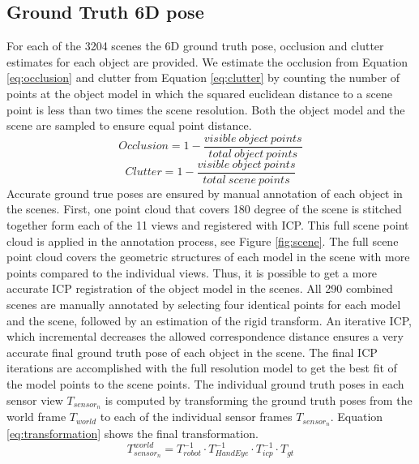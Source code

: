 \documentclass[10pt,twocolumn,letterpaper]{article}
\begin{document}
\subsection{Ground Truth 6D pose}\label{sec:gt_pose}
For each of the 3204 scenes the 6D ground truth pose, occlusion and clutter estimates for each object are provided. We estimate the occlusion from Equation \ref{eq:occlusion} and clutter from Equation \ref{eq:clutter} by counting the number of points at the object model in which the squared euclidean distance to a scene point is less than two times the scene resolution. Both the object model and the scene are sampled to ensure equal point distance.
\begin{equation}
Occlusion = 1 - \frac{visible \: object \: points }{total \: object \: points} 
\label{eq:occlusion}
\end{equation}
\begin{equation}
Clutter = 1 - \frac{visible \: object \: points}{total \: scene \: points}
\label{eq:clutter}
\end{equation}
\indent
Accurate ground true poses are ensured by manual annotation of each object in the scenes. First, one point cloud that covers 180 degree of the scene is stitched together form each of the 11 views and registered with ICP. This full scene point cloud is applied in the annotation process, see Figure \ref{fig:scene}. The full scene point cloud covers the geometric structures of each model in the scene with more points compared to the individual views. Thus, it is possible to get a more accurate ICP registration of the object model in the scenes. All 290 combined scenes are manually annotated by selecting four identical points for each model and the scene, followed by an estimation of the rigid transform. An iterative ICP, which incremental decreases the allowed correspondence distance ensures a very accurate final ground truth pose of each object in the scene. The final ICP iterations are accomplished with the full resolution model to get the best fit of the model points to the scene points. The individual ground truth poses in each sensor view $T_{sensor_{n}}$ is computed by transforming the ground truth poses from the world frame $T_{world}$ to each of the individual sensor frames $T_{sensor_{n}}$. Equation \ref{eq:transformation} shows the final transformation. 
\begin{equation}
T^{world}_{sensor_{n}} = T^{-1}_{robot} \cdot T^{-1}_{HandEye} \cdot T^{-1}_{icp} \cdot T_{gt}
\label{eq:transformation}
\end{equation}
\end{document}
